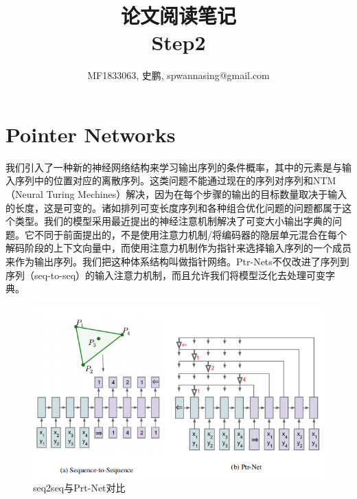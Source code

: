 \documentclass[a4paper,UTF8]{article}
\numberwithin{equation}{section}
\begin{document}
\title{论文阅读笔记\\
Step2}
\author{MF1833063, 史鹏, spwannasing@gmail.com}
\maketitle
\newpage
\section{Pointer Networks}
我们引入了一种新的神经网络结构来学习输出序列的条件概率，其中的元素是与输入序列中的位置对应的离散序列。这类问题不能通过现在的序列对序列和NTM（Neural Turing Mechines）解决，因为在每个步骤的输出的目标数量取决于输入的长度，这是可变的。诸如排列可变长度序列和各种组合优化问题的问题都属于这个类型。我们的模型采用最近提出的神经注意机制解决了可变大小输出字典的问题。它不同于前面提出的，不是使用注意力机制/将编码器的隐层单元混合在每个解码阶段的上下文向量中，而使用注意力机制作为指针来选择输入序列的一个成员来作为输出序列。我们把这种体系结构叫做指针网络。Ptr-Nets不仅改进了序列到序列（seq-to-seq）的输入注意力机制，而且允许我们将模型泛化去处理可变字典。
\begin{figure}[H]
	\centering
	\includegraphics[width=\textwidth]{1-1.png}
	\caption{seq2seq与Prt-Net对比}
\end{figure}
\end{document}
